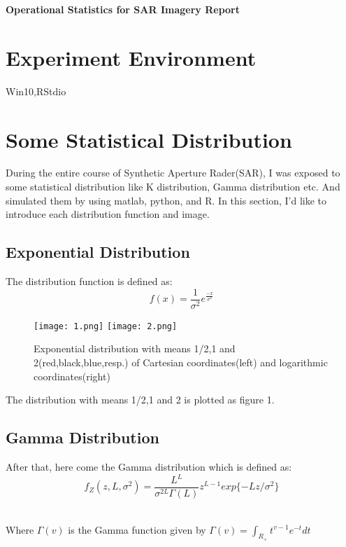 \documentclass[UTF8,a4paper,10pt]{ctexart}
\begin{document}
\centerline{\LARGE\textbf{Operational Statistics for SAR Imagery Report}} 
\vspace{1cm}

\qquad\qquad{}\qquad\qquad\qquad\qquad\qquad\qquad\qquad{}
\renewcommand\arraystretch{1.5}


\section{Experiment Environment}
Win10,RStdio

\section{Some Statistical Distribution}
During the entire course of Synthetic Aperture Rader(SAR), I was exposed to some statistical distribution like K distribution, Gamma distribution etc. And simulated them by using matlab, python, and R. In this section, I'd like to introduce each distribution function and image.

\subsection{Exponential Distribution}
The distribution function is defined as:
\begin{equation}
f(x) = \frac{1}{\sigma^2}e^\frac{-x}{\sigma^2}
\end{equation}

\begin{figure}[htb] \center
	\texttt{[image: 1.png]}
	\texttt{[image: 2.png]}
	\caption{ Exponential distribution with means 1/2,1 and 2(red,black,blue,resp.) of Cartesian coordinates(left) and logarithmic coordinates(right)} 
\end{figure}
\par The distribution with means 1/2,1 and 2 is plotted as figure 1.

\subsection{Gamma Distribution}
After that, here come the Gamma distribution which is defined as:
\begin{equation}
f_Z(z,L,\sigma^2) = \frac{L^L}{\sigma^{2L}\Gamma(L)}z^{L-1}exp\{-Lz/\sigma^2\}
\end{equation}
\\\par Where $\Gamma(v)$ is the Gamma function given by $\Gamma(v) = \int_{R_+} {t^{v-1}e^{-t}dt}$
\end{document}
